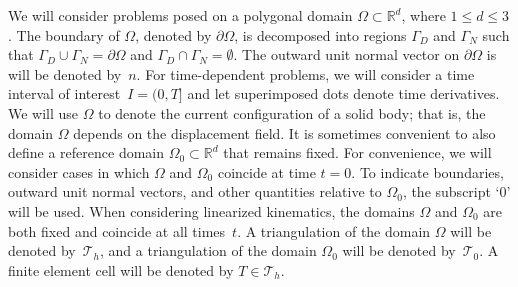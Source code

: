 We will consider problems posed on a polygonal domain $\Omega \subset
\mathbb{R}^{d}$, where $1 \le d \le 3$. The boundary of $\Omega$,
denoted by $\partial \Omega$, is decomposed into regions $\Gamma_{D}$
and $\Gamma_{N}$ such that $\Gamma_{D} \cup \Gamma_{N} = \partial \Omega$
and $\Gamma_{D} \cap \Gamma_{N} = \emptyset$.  The outward unit normal
vector on $\partial \Omega$ is will be denoted by~$n$.  For time-dependent
problems, we will consider a time interval of interest~$I = (0, T]$
and let superimposed dots denote time derivatives.  We will use $\Omega$
to denote the current configuration of a solid body; that is, the domain
$\Omega$ depends on the displacement field. It is sometimes convenient
to also define a reference domain $\Omega_{0} \subset \mathbb{R}^{d}$
that remains fixed.  For convenience, we will consider cases in which
$\Omega$ and $\Omega_{0}$ coincide at time $t = 0$.  To indicate
boundaries, outward unit normal vectors, and other quantities relative
to $\Omega_{0}$, the subscript `$0$' will be used.  When considering
linearized kinematics, the domains $\Omega$ and $\Omega_{0}$ are both
fixed and coincide at all times~$t$.  A triangulation of the domain
$\Omega$ will be denoted by~$\mathcal{T}_h$, and a triangulation of the
domain $\Omega_{0}$ will be denoted by~$\mathcal{T}_{0}$.  A finite
element cell will be denoted by $T \in \mathcal{T}_h$.

